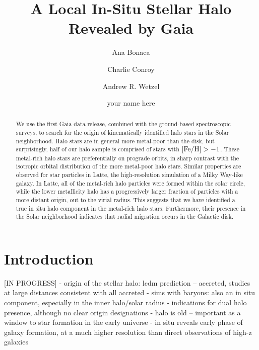 \documentclass[apj, twocolappendix, numberedappendix, appendixfloats]{emulateapj}
\begin{document}
\title{A Local In-Situ Stellar Halo Revealed by Gaia}
\author{Ana Bonaca}
\author{Charlie Conroy}
\author{Andrew R. Wetzel}
\author{your name here}


\begin{abstract}
We use the first Gaia data release, combined with the ground-based spectroscopic surveys, to search for the origin of kinematically identified halo stars in the Solar neighborhood.
Halo stars are in general more metal-poor than the disk, but surprisingly, half of our halo sample is comprised of stars with $\rm[Fe/H]>-1$.
These metal-rich halo stars are preferentially on prograde orbits, in sharp contrast with the isotropic orbital distribution of the more metal-poor halo stars.
Similar properties are observed for star particles in Latte, the high-resolution simulation of a Milky Way-like galaxy.
In Latte, all of the metal-rich halo particles were formed within the solar circle, while the lower metallicity halo has a progressively larger fraction of particles with a more distant origin, out to the virial radius.
This suggests that we have identified a true in situ halo component in the metal-rich halo stars.
Furthermore, their presence in the Solar neighborhood indicates that radial migration occurs in the Galactic disk.
\end{abstract}
\maketitle

\section{Introduction}
[IN PROGRESS]
- origin of the stellar halo: lcdm prediction -- accreted, studies at large distances consistent with all accreted
- sims with baryons: also an in situ component, especially in the inner halo/solar radius
- indications for dual halo presence, although no clear origin designations
- halo is old -- important as a window to star formation in the early universe
- in situ reveals early phase of galaxy formation, at a much higher resolution than direct observations of high-z galaxies
\end{document}
